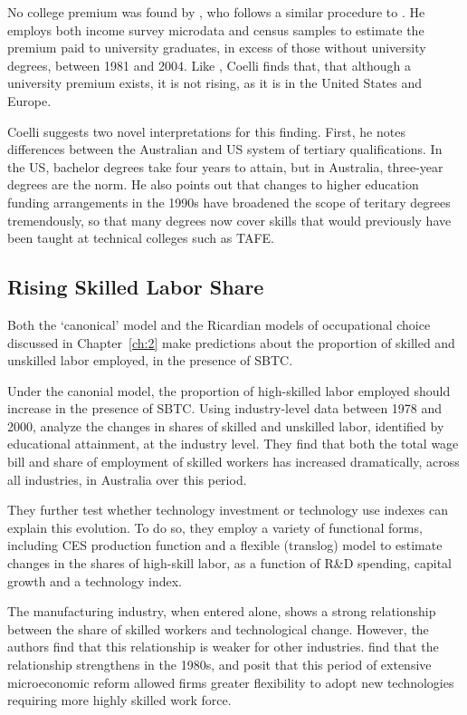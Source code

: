 No college premium was found by \citet{Coelli2009}, who follows a similar procedure to \citet{Katz1992}. He employs both income survey microdata and census samples to estimate the premium paid to university graduates, in excess of those without university degrees, between 1981 and 2004. Like \citet{Barnes2002}, Coelli finds that, that although a university premium exists, it is not rising, as it is in the United States and Europe.

Coelli suggests two novel interpretations for this finding. First, he notes differences between the Australian and US system of tertiary qualifications. In the US, bachelor degrees take four years to attain, but in Australia, three-year degrees are the norm. He also points out that changes to higher education funding arrangements in the 1990s have broadened the scope of teritary degrees tremendously, so that many degrees now cover skills that would previously have been taught at technical colleges such as TAFE.

\subsection{Rising Skilled Labor Share}

Both the `canonical' model and the Ricardian models of occupational choice discussed in Chapter~\ref{ch:2} make predictions about the proportion of skilled and unskilled labor employed, in the presence of SBTC. 

Under the canonial model, the proportion of high-skilled labor employed should increase in the presence of SBTC. Using industry-level data between 1978 and 2000, \citet{DeLaine2001} analyze the changes in shares of skilled and unskilled labor, identified by educational attainment, at the industry level. They find that both the total wage bill and share of employment of skilled workers has increased dramatically, across all industries, in Australia over this period.

They further test whether technology investment or technology use indexes can explain this evolution. To do so, they employ a variety of functional forms, including CES production function and a flexible (translog) model to estimate changes in the shares of high-skill labor, as a function of R\&D spending, capital growth and a technology index. 

The manufacturing industry, when entered alone, shows a strong relationship between the share of skilled workers and technological change. However, the authors find that this relationship is weaker for other industries. \citet{DeLaine2001} find that the relationship strengthens in the 1980s, and posit that this period of extensive microeconomic reform allowed firms greater flexibility to adopt new technologies requiring more highly skilled work force.


